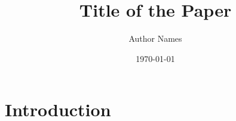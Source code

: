 \documentclass{article}
\title{Title of the Paper}
\author{Author Names}
\date{\today}
\begin{document}
\maketitle

\begin{abstract}
\end{abstract}

\section{Introduction}




\end{document}
